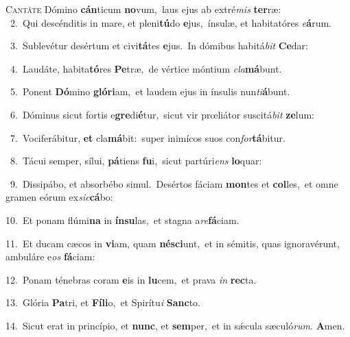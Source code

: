 \lettrine{\initial\textcolor{\initialcolor}{C}}{antáte} Dómino \textbf{cán}\-ticum \textbf{no}\-vum,~\star laus ejus ab extré\textit{mis} \textbf{ter}\-ræ:\\
{\numbfont\textcolor{\numbcolor}{~2.}}~Qui descénditis in mare, et pleni\-\textbf{tú}\-do \textbf{e}\-jus,~\star ínsulæ, et habitatóres \textit{e}\-\textbf{á}rum.\par
{\numbfont\textcolor{\numbcolor}{~3.}}~Sublevétur desértum et civi\-\textbf{tá}\-tes \textbf{e}\-jus.~\star In dómibus habitá\textit{bit} \textbf{Ce}\-dar:\par
{\numbfont\textcolor{\numbcolor}{~4.}}~Laudáte, habita\-\textbf{tó}\-res \textbf{Pe}\-træ,~\star de vértice móntium \textit{cla}\-\textbf{má}bunt.\par
{\numbfont\textcolor{\numbcolor}{~5.}}~Ponent \textbf{Dó}\-mino \textbf{gló}\-\textbf{ri}am,~\star et laudem ejus in ínsulis nun\-\textit{ti}\-\textbf{á}bunt.\par
{\numbfont\textcolor{\numbcolor}{~6.}}~Dóminus sicut fortis e\-\textbf{gre}\-di\-\textbf{é}\-tur,~\star sicut vir prœliátor suscitá\textit{bit} \textbf{ze}\-lum:\par
{\numbfont\textcolor{\numbcolor}{~7.}}~Vociferábitur, \textbf{et} cla\-\textbf{má}\-bit:~\star super inimícos suos con\-\textit{for}\-\textbf{tá}bitur.\par
{\numbfont\textcolor{\numbcolor}{~8.}}~Tácui semper, sílui, \textbf{pá}\-tiens \textbf{fu}\-i,~\star sicut partúri\textit{ens} \textbf{lo}\-quar:\par
{\numbfont\textcolor{\numbcolor}{~9.}}~Dissipábo, et absorbébo simul.~\dagger Desértos fáciam \textbf{mon}\-tes et \textbf{col}\-les,~\star et omne gramen eórum ex\-\textit{sic}\-\textbf{cá}bo:\par
{\numbfont\textcolor{\numbcolor}{10.}}~Et ponam flúmi\textbf{na} in \textbf{ín}\-\textbf{su}las,~\star et stagna a\-\textit{re}\-\textbf{fá}ciam.\par
{\numbfont\textcolor{\numbcolor}{11.}}~Et ducam cæcos in \textbf{vi}\-am, quam \textbf{né}\-\textbf{sci}unt,~\star et in sémitis, quas ignoravérunt, ambuláre e\textit{os} \textbf{fá}\-ciam:\par
{\numbfont\textcolor{\numbcolor}{12.}}~Ponam ténebras coram \textbf{e}\-is in \textbf{lu}\-cem,~\star et prava \textit{in} \textbf{rec}\-ta.\par
{\numbfont\textcolor{\numbcolor}{13.}}~Glória \textbf{Pa}\-tri, et \textbf{Fí}\-\textbf{li}o,~\star et Spirítu\textit{i} \textbf{Sanc}\-to.\par
{\numbfont\textcolor{\numbcolor}{14.}}~Sicut erat in princípio, et \textbf{nunc}\-, et \textbf{sem}\-per,~\star et in sǽcula sæculó\-\textit{rum}\-. \textbf{A}\-men.\par
